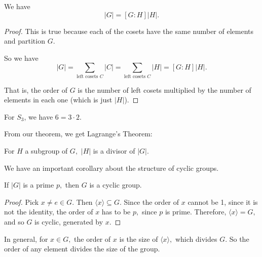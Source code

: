 \begin{theorem}
We have
\[
|G| = [G:H]|H|.
\]
\end{theorem}

\begin{proof}
This is true because each of the cosets have the same number of elements and partition $G$. 

So we have
\[
|G| = \sum_{\text{left cosets } C} |C| = \sum_{\text{left cosets } C} |H| = [G:H]|H|.
\]

That is, the order of $G$ is the number of left cosets multiplied by the number of elements in each one (which is just $|H|$).
\end{proof}
\begin{example}
For $S_3$, we have $6 = 3 \cdot 2.$
\end{example}

From our theorem, we get Lagrange's Theorem:
\begin{corollary}
For $H$ a subgroup of $G,$ $|H|$ is a divisor of $|G|.$
\end{corollary}

We have an important corollary about the structure of cyclic groups.
\begin{corollary}
If $|G|$ is a prime $p,$ then $G$ is a cyclic group. 
\end{corollary}
\begin{proof}
Pick $x \neq e \in G.$ Then $\langle x \rangle \subseteq G$. Since the order of $x$ cannot be 1, since it is not the identity, the order of $x$ has to be $p,$ since $p$ is prime. Therefore, $\langle x \rangle = G,$ and so $G$ is cyclic, generated by $x.$
\end{proof}

In general, for $x \in G,$ the order of $x$ is the size of $\langle x \rangle,$ which divides $G.$ So the order of any element divides the size of the group. 

\newpage